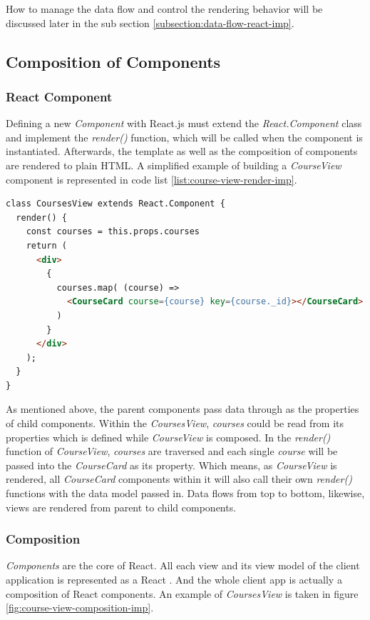 How to manage the data flow and control the rendering behavior will be discussed later in the sub section \ref{subsection:data-flow-react-imp}.


\subsection{Composition of Components}

\subsubsection{React Component}

Defining a new \textit{Component} with React.js must extend the \textit{React.Component} class and implement the \textit{render()} function, which will be called when the component is instantiated. Afterwards, the template as well as the composition of components are rendered to plain HTML.  A simplified example of building a \textit{CourseView} component is represented in code list \ref{list:course-view-render-imp}.

\begin{lstlisting}[language=HTML, caption=Rendering \textit{CourseView} with multiple \textit{CourseCard} components , label={list:course-view-render-imp}]
class CoursesView extends React.Component {
  render() {
    const courses = this.props.courses
    return (
      <div>
        {
          courses.map( (course) =>
            <CourseCard course={course} key={course._id}></CourseCard>
          )
        }
      </div>
    ); 
  }
}
\end{lstlisting}

As mentioned above, the parent components pass data through as the properties of child components. Within the \textit{CoursesView}, \textit{courses} could be read from its properties which is defined while \textit{CourseView} is composed. In the \textit{render()} function of \textit{CourseView}, \textit{courses} are traversed and each single \textit{course} will be passed into the \textit{CourseCard} as its property. Which means, as \textit{CourseView} is rendered, all \textit{CourseCard} components within it will also call their own \textit{render()} functions with the data model passed in. Data flows from top to bottom, likewise, views are rendered from parent to child components.

\subsubsection{Composition}
\textit{Components} are the core of React. All each view and its view model of the client application is represented as a React . And the whole client app is actually a composition of React components. An example of \textit{CoursesView} is taken in figure \ref{fig:course-view-composition-imp}.


